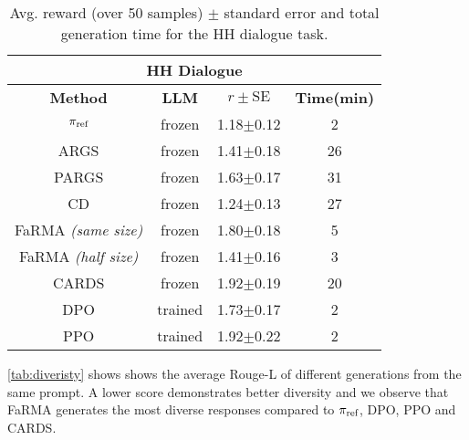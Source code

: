 \begin{table}[ht]
  \centering
  \footnotesize
  \begin{tabular}{cccc}
    \toprule
    \multicolumn{4}{c}{\textbf{HH Dialogue}}                                    \\
    \midrule
    \textbf{Method} & \textbf{LLM}  & $r \pm \text{SE}$ & \textbf{Time(min)}     \\
    \midrule
    $\pi_\text{ref}$       & frozen    & 1.18$\pm$0.12 & 2        \\
    \midrule
    ARGS            & frozen   & 1.41$\pm$0.18   & 26       \\
    PARGS       & frozen         & 1.63$\pm$0.17    & 31     \\
    CD       & frozen         & 1.24$\pm$0.13    & 27     \\
    FaRMA \emph{(same size)}  & frozen  & 1.80$\pm$0.18 & 5     \\
    FaRMA \emph{(half size)}   & frozen   & 1.41$\pm$0.16 & 3      \\
    CARDS  & frozen   & 1.92$\pm$0.19   & 20    \\
    \midrule
    DPO   & trained       & 1.73$\pm$0.17    & 2     \\
    PPO     & trained   & 1.92$\pm$0.22  & 2   \\
    \bottomrule
  \end{tabular}
  \caption{Avg. reward (over 50 samples) $\pm$ standard error and total generation time for the HH dialogue task.}
  \label{tab:HH}
   \vspace{-1em}
\end{table}

\cref{tab:diveristy} shows shows the average Rouge-L of different generations from the same prompt. A lower score demonstrates better diversity and we observe that FaRMA generates the most diverse responses compared to $\pi_\text{ref}$, DPO, PPO and CARDS.


